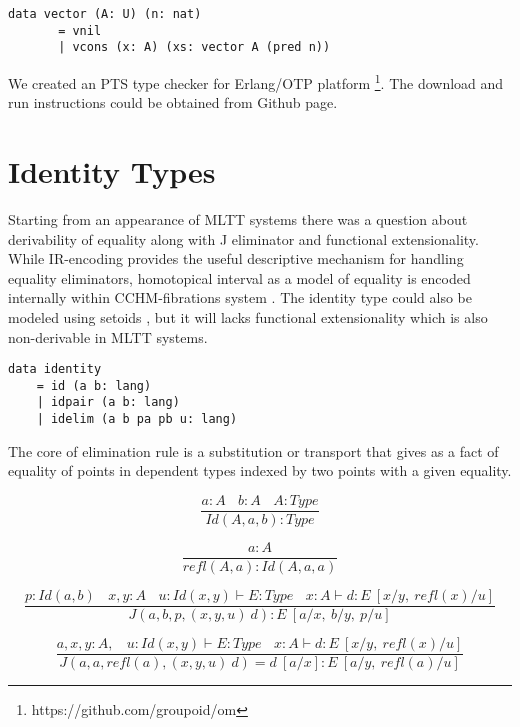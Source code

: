 \documentclass{aip-cp}
\begin{document}
\begin{lstlisting}[mathescape=true]
    data vector (A: U) (n: nat)
       = vnil
       | vcons (x: A) (xs: vector A (pred n))
\end{lstlisting}

We created an PTS type checker for Erlang/OTP platform \footnote{https://github.com/groupoid/om}.
The download and run instructions could be obtained from Github page.

\section{Identity Types}

Starting from an appearance of MLTT systems there was a question about derivability of equality
along with J eliminator and functional extensionality. While IR-encoding \cite{Dagand13} provides
the useful descriptive mechanism for handling equality eliminators, homotopical interval
as a model of equality is encoded internally within CCHM-fibrations system \cite{Orton17}. The
identity type could also be modeled using setoids \cite{Bishop67}, but it will lacks functional
extensionality which is also non-derivable in MLTT systems.

\begin{lstlisting}[mathescape=true]
data identity
    = id (a b: lang)
    | idpair (a b: lang)
    | idelim (a b pa pb u: lang)
\end{lstlisting}

The core of elimination rule is a substitution or transport that gives as
a fact of equality of points in dependent types indexed by two points with a given equality.

\begin{equation}
\tag{$Id$-formation}
\dfrac
  {a:A\ \ \ \ b:A\ \ \ \ A:Type}
  {Id(A,a,b) : Type}
\end{equation}

\begin{equation}
\tag{$Id$-intro}
\dfrac
  {a:A}
  {refl(A,a) : Id(A,a,a) }
\end{equation}

\begin{equation}
\tag{$J$-elimination}
\dfrac
  {p:Id(a,b)\ \ \ \ x,y:A\ \ \ \ u:Id(x,y) \vdash E:Type\ \ \ \ x:A \vdash d: E\ [x/y,\ refl(x)/u]}
  {J(a,b,p,(x,y,u)\ d) : E\ [a/x,\ b/y,\ p/u]}
\end{equation}

\begin{equation}
\tag{$Id$-computation}
\dfrac
  {a,x,y:A,\ \ \ \ u:Id(x,y) \vdash E:Type\ \ \ \ x:A \vdash d:E\ [x/y,\ refl(x)/u]}
  {J(a,a,refl(a),(x,y,u)\ d) = d\ [a/x] : E\ [a/y,\ refl(a)/u]}
\end{equation}
\end{document}
